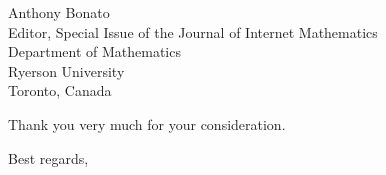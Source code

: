 \begin{letter}{
Anthony Bonato \\
Editor, Special Issue of the Journal of Internet Mathematics  \\
Department of Mathematics \\
Ryerson University \\
Toronto, Canada
}

Thank you very much for your consideration.

\closing{Best regards,}
\end{letter}





